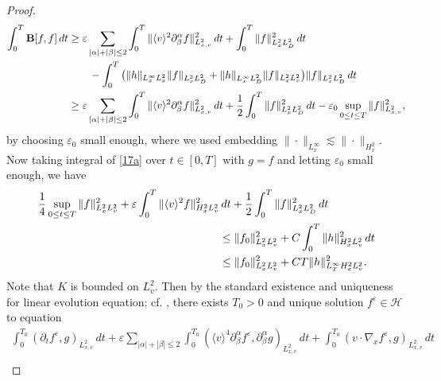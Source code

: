 \documentclass[reqno,a4paper]{amsart}
\numberwithin{equation}{section}
\newcommand{\1}{\mathbf{1}}
\newcommand{\ve}{\varepsilon}
\newcommand{\<}{\langle}
\renewcommand{\>}{\rangle}
\begin{document}
\begin{proof}
\begin{align*}
	\int^T_0\mathbf{B}[f,f]\,dt&\ge \ve\sum_{|\alpha|+|\beta|\le 2}\int^T_0\|\<v\>^{2}\partial^\alpha_\beta f\|^2_{L^2_{x,v}}\,dt +\int^T_0\|f\|_{L^2_xL^2_D}^2\,dt\\
	&\notag\qquad - \int^T_0\big(\|h\|_{L^\infty_xL^2_x}\|f\|_{L^2_xL^2_D}+\|h\|_{L^\infty_xL^2_D}\|f\|_{L^2_xL^2_v}\big)\|f\|_{L^2_xL^2_D}\,dt\\
	&\notag\ge {\ve}\sum_{|\alpha|+|\beta|\le 2}\int^T_0\|\<v\>^{2}\partial^\alpha_\beta f\|^2_{L^2_{x,v}}\,dt + \frac{1}{2}\int^T_0\|f\|_{L^2_xL^2_D}^2\,dt- \ve_0\sup_{0\le t\le T}\|f\|^2_{L^2_{x,v}},
\end{align*}
by choosing $\ve_0$ small enough, where we used embedding $\|\cdot\|_{L^\infty_x}\lesssim \|\cdot\|_{H^2_x}$. 
Now taking integral of \eqref{17a} over $t\in[0,T]$ with $g=f$ and letting $\ve_0$ small enough, we have 
\begin{align}\label{19}\notag
	\frac{1}{4}\sup_{0\le t\le T}\|f\|^2_{L^2_xL^2_v} + {\ve}\int^T_0\|\<v\>^{2} f\|^2_{H^2_xL^2_v}&\,dt + \frac{1}{2}\int^T_0\|f\|_{L^2_xL^2_D}^2\,dt\\
	\notag &\le \|f_0\|^2_{L^2_xL^2_v} + C\int^{T}_0\|h\|^2_{H^2_xL^2_v}\,dt\\
	&\le\|f_0\|^2_{L^2_xL^2_v}+ CT\|h\|^2_{L^\infty_{T}H^2_xL^2_v}. 
\end{align}
Note that $K$ is bounded on $L^2_v$. 
Then by the standard existence and uniqueness for linear evolution equation; cf. \cite{Evans2010}, there exists $T_0>0$ and unique solution $f^\ve\in\mathcal{H}$ to equation 
\begin{multline}\label{18}
	\int^{T_0}_0(\partial_tf^\ve,g)_{L^2_{x,v}}\,dt+ \ve\sum_{|\alpha|+|\beta|\le 2}\int^{T_0}_0(\<v\>^{4}\partial^\alpha_\beta f^\ve,\partial^\alpha_\beta g)_{L^2_{x,v}}\,dt+\int^{T_0}_0(v\cdot \nabla_xf^\ve,g)_{L^2_{x,v}}\,dt\\ 

\end{multline}
\end{proof}
\end{document}
